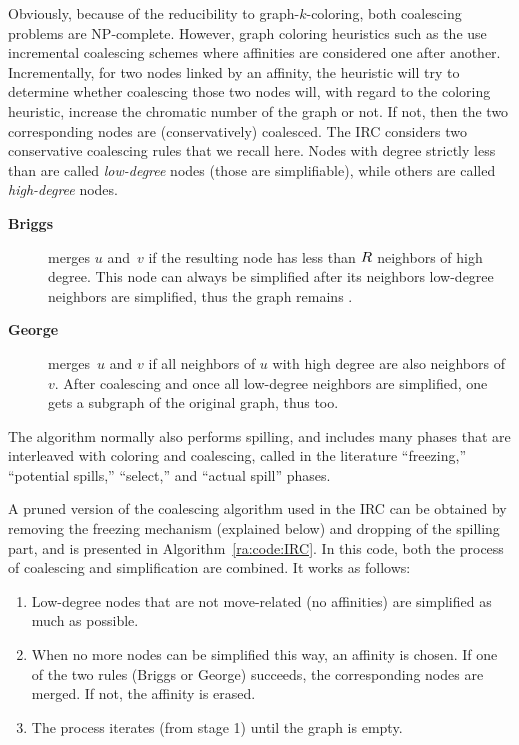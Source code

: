 {Obviously, because of the reducibility to graph-$k$-coloring, both coalescing problems are NP-complete.
However, graph coloring heuristics such as the \irc use incremental coalescing schemes where affinities are considered one after another.
Incrementally, for two nodes linked by an affinity, the heuristic will try to determine whether coalescing those two nodes will, with regard to the coloring heuristic, increase the chromatic number of the graph or not.
If not, then the two corresponding nodes are (conservatively) coalesced.
The IRC considers two conservative coalescing rules that we recall here. Nodes with degree strictly less than \regs are called \emph{low-degree} nodes (those are simplifiable), while others are called \emph{high-degree} nodes.

\begin{description}
  \item[\textbf{Briggs}] merges $u$ and~$v$ if the resulting node has 
    less than $R$ neighbors of high degree. This node can 
    always be simplified after its neighbors low-degree neighbors are simplified, 
    thus the graph remains \gr{\regs}.
    \smallskip

  \item[\textbf{George}] merges~$u$ and $v$ if all neighbors of $u$ with 
    high degree are also neighbors of $v$. After coalescing and once all low-degree 
    neighbors are simplified, one gets a subgraph of the original graph, thus \gr{\regs} too.
\end{description}

The \irc algorithm normally also performs spilling, and includes many phases that are interleaved with coloring and coalescing, called in the literature ``freezing,'' ``potential spills,'' ``select,'' and ``actual spill'' phases.

A pruned version of the coalescing algorithm used in the IRC can be obtained by removing the freezing mechanism (explained below) and dropping of the spilling part, and is presented in Algorithm~\ref{ra:code:IRC}.
In this code, both the process of coalescing and simplification are combined.
It works as follows:
\begin{enumerate}
  \item Low-degree nodes that are not move-related (no affinities) are simplified as much as possible.
  \item When no more nodes can be simplified this way, an affinity is chosen. If one of the two rules (Briggs or George) succeeds, the corresponding nodes are merged. If not, the affinity is erased.
  \item The process iterates (from stage 1) until the graph is empty.
\end{enumerate}


}
